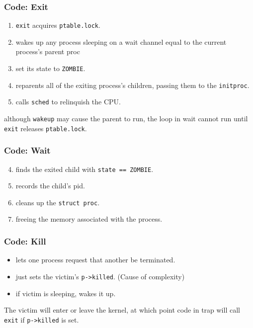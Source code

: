 \documentclass{beamer}
\begin{document}
\begin{frame}[t]
  \frametitle{Code: Exit}

  \begin{enumerate}
  \item \texttt{exit} acquires \texttt{ptable.lock}.
  \item wakes up any process sleeping on a wait
    channel equal to the current process’s parent proc
  \item set its state to \texttt{ZOMBIE}.
  \item reparents all of the exiting process’s children,
    passing them to the \texttt{initproc}.
  \item calls \texttt{sched} to relinquish the CPU.
  \end{enumerate}

  \begin{center}
    although \texttt{wakeup} may cause the parent to run, the loop in wait cannot run until
    \texttt{exit} releases \texttt{ptable.lock}.
  \end{center}

\end{frame}


\begin{frame}[t]
  \frametitle{Code: Wait}

  \begin{enumerate}
    \setcounter{enumi}{3}
  \item finds the exited child with \texttt{state == ZOMBIE}.
  \item records the child’s pid.
  \item cleans up the \texttt{struct proc}.
  \item freeing the memory associated with the process.
  \end{enumerate}
  
\end{frame}


\begin{frame}[t]
  \frametitle{Code: Kill}
  \begin{itemize}
  \item lets one process request that another be terminated.
  \item just sets the victim's \texttt{p->killed}. (Cause of complexity)
  \item if victim is sleeping, wakes it up.
  \end{itemize}

  \begin{center}
    The victim will enter or leave the kernel, at which point code in trap will call
    \texttt{exit} if \texttt{p->killed} is set.
  \end{center}
  
\end{frame}
\end{document}
